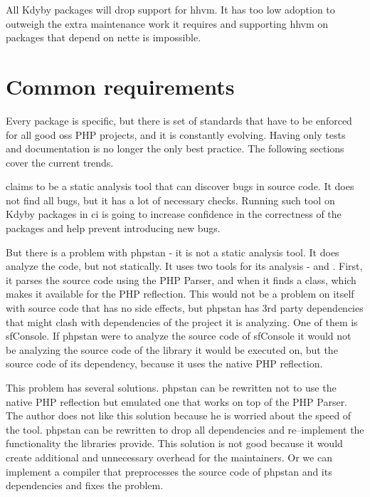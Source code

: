 All Kdyby packages will drop support for \gls{hhvm}. It has too low adoption to outweigh the extra maintenance work it requires and supporting \gls{hhvm} on packages that depend on \gls{nette} is impossible.

\section{Common requirements} \label{sec:roadmap:common}

Every package is specific, but there is set of standards that have to be enforced for all good \gls{oss} PHP projects, and it is constantly evolving. Having only tests and documentation is no longer the only best practice. The following sections cover the current trends.


 claims to be a static analysis tool that can discover bugs in source code. It does not find all bugs, but it has a lot of necessary checks. Running such tool on Kdyby packages in \gls{ci} is going to increase confidence in the correctness of the packages and help prevent introducing new bugs.

But there is a problem with \gls{phpstan} - it is not a static analysis tool. It does analyze the code, but not statically. It uses two tools for its analysis -  and . First, it parses the source code using the PHP Parser, and when it finds a class,  which makes it available for the PHP reflection. This would not be a problem on itself with source code that has no side effects, but \gls{phpstan} has 3rd party dependencies that might clash with dependencies of the project it is analyzing. One of them is \gls{sfConsole}. If \gls{phpstan} were to analyze the source code of \gls{sfConsole} it would not be analyzing the source code of the library it would be executed on, but the source code of its dependency, because it uses the native PHP reflection.

This problem has several solutions. \gls{phpstan} can be rewritten not to use the native PHP reflection but emulated one that works on top of the PHP Parser. The author does not like this solution because he is worried about the speed of the tool. \gls{phpstan} can be rewritten to drop all dependencies and re--implement the functionality the libraries provide. This solution is not good because it would create additional and unnecessary overhead for the maintainers. Or we can implement a compiler that preprocesses the source code of \gls{phpstan} and its dependencies and fixes the problem.

